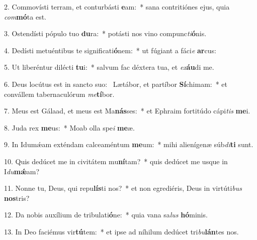 2. Commovísti terram, et conturbásti \textbf{e}am:~*  sana contritiónes ejus, quia \textit{com}\textbf{mó}ta est.\

3. Ostendísti pópulo tuo \textbf{du}ra:~*  potásti nos vino compunc\textit{ti}\textbf{ó}nis.\

4. Dedísti metuéntibus te significati\textbf{ó}nem:~*  ut fúgiant a fáci\textit{e} \textbf{ar}cus:\

5. Ut liberéntur dilécti \textbf{tu}i:~*  salvum fac déxtera tua, et \textit{ex}\textbf{áu}di me.\

6. Deus locútus est in sancto suo: \dag\  Lætábor, et partíbor \textbf{Sí}chimam:~*  et convállem tabernaculórum \textit{me}\textbf{tí}bor.\

7. Meus est Gálaad, et meus est Ma\textbf{nás}ses:~*  et Ephraim fortitúdo cápi\textit{tis} \textbf{me}i.\

8. Juda rex \textbf{me}us:~*  Moab olla spe\textit{i} \textbf{me}æ.\

9. In Idumǽam exténdam calceaméntum \textbf{me}um:~*  mihi alienígenæ súb\textit{di}\textbf{ti} sunt.\

10. Quis dedúcet me in civitátem mu\textbf{ní}tam?~*  quis dedúcet me usque in I\textit{du}\textbf{mǽ}am?\

11. Nonne tu, Deus, qui repu\textbf{lís}ti nos?~*  et non egrediéris, Deus in virtúti\textit{bus} \textbf{nos}tris?\

12. Da nobis auxílium de tribulati\textbf{ó}ne:~*  quia vana sa\textit{lus} \textbf{hó}minis.\

13. In Deo faciémus vir\textbf{tú}tem:~*  et ipse ad níhilum dedúcet tri\textit{bu}\textbf{lán}tes nos.\

